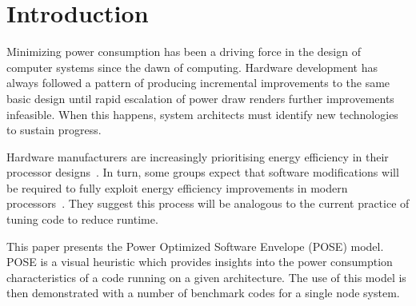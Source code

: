 \section{Introduction}

Minimizing power consumption has been a driving force in the design of computer systems since the dawn of computing.
Hardware development has always followed a pattern of producing incremental improvements to the same basic design until rapid escalation of power draw renders further improvements infeasible.
When this happens, system architects must identify new technologies to sustain progress.

Hardware manufacturers are increasingly prioritising energy efficiency in their processor designs~\cite{kurd:2014aa}.
In turn, some groups expect that software modifications will be required to fully exploit energy efficiency improvements in modern processors~\cite{shao:2013aa}.
They suggest this process will be analogous to the current practice of tuning code to reduce runtime.

This paper presents the Power Optimized Software Envelope (POSE) model. 
POSE is a visual heuristic which provides insights into the  power consumption characteristics of a code running on a given architecture.
The use of this model is then demonstrated with a number of benchmark codes for a single node system.
